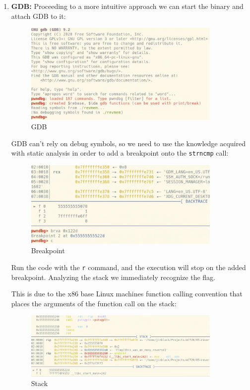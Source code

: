 \documentclass{article}
\begin{document}
\begin{enumerate}
\item{\textbf{GDB:}}
\noindent\linebreak
Proceeding to a more intuitive approach we can start the binary and attach GDB to it:
\begin{figure}[H]
\centering
\includegraphics[width=0.9\textwidth]{img/gdb_1.jpg}
\caption{GDB}
\label{fig:gdb_1}
\end{figure}

\noindent\linebreak
GDB can't rely on debug symbols, so we need to use the knowledge acquired with static analysis in order to
add a breakpoint onto the \texttt{strncmp} call:
\begin{figure}[H]
\centering
\includegraphics[width=0.9\textwidth]{img/gdb_2.jpg}
\caption{Breakpoint}
\label{fig:gdb_2}
\end{figure}

\noindent\linebreak
Run the code with the \texttt{r} command, and the execution will stop on the added breakpoint. Analyzing the
stack we immediately recognize the flag. 

\pagebreak 
This is due to the x86 base Linux machines function calling 
convention that places the arguments of the function call on the stack:
\begin{figure}[H]
\centering
\includegraphics[width=0.9\textwidth]{img/gdb_3.jpg}
\caption{Stack}
\label{fig:gdb_3}
\end{figure}


\end{enumerate}
\end{document}
